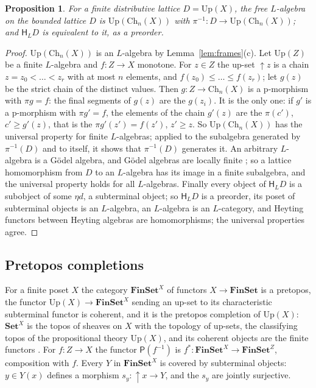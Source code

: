 \documentclass[11pt]{amsart}
\newtheorem{prop}[thm]{Proposition}
\theoremstyle{definition}
\newcommand{\Set}{\mathbf{Set}}
\newcommand{\Fin}{\mathbf{FinSet}}
\newcommand{\Up}{\mathrm{Up}}
\newcommand{\Ch}{\mathrm{Ch}}
\newcommand{\PP}{\mathsf P}
\newcommand{\HH}{\mathsf H}
\begin{document}
\begin{prop}\label{prop:free}
For a finite distributive lattice $D=\Up(X)$, the free $L$-algebra on
the bounded lattice $D$ is $\Up(\Ch_n(X))$ with $\pi^{-1}\colon D\to
\Up(\Ch_n(X))$; and $\HH_LD$ is equivalent to it, as a preorder.
\end{prop}
\begin{proof}
$\Up(\Ch_n(X))$ is an $L$-algebra by Lemma~\ref{lem:frames}(c). Let
$\Up(Z)$ be a finite $L$-algebra and $f\colon Z\to X$ monotone. For
$z\in Z$ the up-set $\uparrow\!z$ is a chain $z=z_0<\dots<z_r$ with at
most $n$ elements, and $f(z_0)\le\dots\le f(z_r)$; let $g(z)$ be the
strict chain of the distinct values. Then $g\colon Z\to\Ch_n(X)$ is a
p-morphism with $\pi g=f$: the final segments of $g(z)$ are the
$g(z_i)$. It is the only one: if $g'$ is a p-morphism with $\pi g'=f$,
the elements of the chain $g'(z)$ are the $\pi(c')$, $c'\ge g'(z)$,
that is the $\pi g'(z')=f(z')$, $z'\ge z$. So $\Up(\Ch_n(X))$ has the
universal property for finite $L$-algebras; applied to the subalgebra
generated by $\pi^{-1}(D)$ and to itself, it shows that $\pi^{-1}(D)$
generates it. An arbitrary $L$-algebra is a G\"odel algebra, and
G\"odel algebras are locally finite \cite{Horn69}; so a lattice
homomorphism from $D$ to an $L$-algebra has its image in a finite
subalgebra, and the universal property holds for all $L$-algebras.
Finally every object of $\HH_LD$ is a subobject of some $\eta d$, a
subterminal object; so $\HH_LD$ is a preorder, its poset of subterminal
objects is an $L$-algebra, an $L$-algebra is an $L$-category, and
Heyting functors between Heyting algebras are homomorphisms; the
universal properties agree.
\end{proof}

\subsection*{Pretopos completions}
For a finite poset $X$ the category $\Fin^X$ of functors $X\to\Fin$ is
a pretopos, the functor $\Up(X)\to\Fin^X$ sending an up-set to its
characteristic subterminal functor is coherent, and it is the pretopos
completion of $\Up(X)$: $\Set^X$ is the topos of sheaves on $X$ with
the topology of up-sets, the classifying topos of the propositional
theory $\Up(X)$, and its coherent objects are the finite functors
\cite[D3.3]{Elephant}. For $f\colon Z\to X$ the functor $\PP(f^{-1})$
is $f^*\colon\Fin^X\to\Fin^Z$, composition with $f$. Every $Y$ in
$\Fin^X$ is covered by subterminal objects: $y\in Y(x)$ defines a
morphism $s_y\colon\uparrow\!x\to Y$, and the $s_y$ are jointly
surjective.
\end{document}
